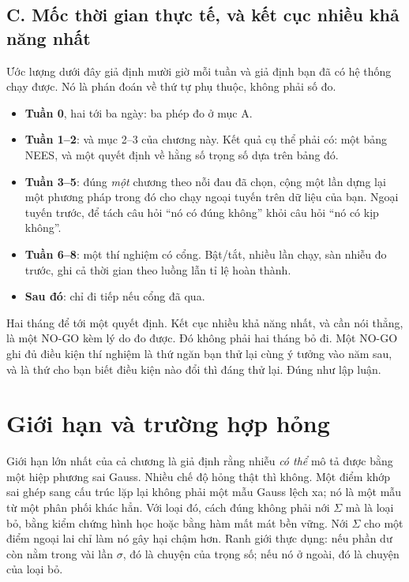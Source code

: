 \documentclass[../../deep_learning.tex]{subfiles}
\begin{document}
\subsection{C. Mốc thời gian thực tế, và kết cục nhiều khả năng nhất}

Ước lượng dưới đây giả định mười giờ mỗi tuần và giả định bạn đã có hệ thống chạy được. Nó là phán đoán về thứ tự phụ thuộc, không phải số đo.

\begin{itemize}
\item \textbf{Tuần 0}, hai tới ba ngày: ba phép đo ở mục A.
\item \textbf{Tuần 1--2}:  và mục 2--3 của chương này. Kết quả cụ thể phải có: một bảng NEES, và một quyết định về hằng số trọng số dựa trên bảng đó.
\item \textbf{Tuần 3--5}: đúng \emph{một} chương theo nỗi đau đã chọn, cộng một lần dựng lại một phương pháp trong đó cho chạy ngoại tuyến trên dữ liệu của bạn. Ngoại tuyến trước, để tách câu hỏi ``nó có đúng không'' khỏi câu hỏi ``nó có kịp không''.
\item \textbf{Tuần 6--8}: một thí nghiệm có cổng. Bật/tắt, nhiều lần chạy, sàn nhiễu đo trước, ghi cả thời gian theo luồng lẫn tỉ lệ hoàn thành.
\item \textbf{Sau đó}: chỉ đi tiếp nếu cổng đã qua.
\end{itemize}

Hai tháng để tới một quyết định. Kết cục nhiều khả năng nhất, và cần nói thẳng, là một NO-GO kèm lý do đo được. Đó không phải hai tháng bỏ đi. Một NO-GO ghi đủ điều kiện thí nghiệm là thứ ngăn bạn thử lại cùng ý tưởng vào năm sau, và là thứ cho bạn biết điều kiện nào đổi thì đáng thử lại. Đúng như  lập luận.

\section{Giới hạn và trường hợp hỏng}

Giới hạn lớn nhất của cả chương là giả định rằng nhiễu \emph{có thể} mô tả được bằng một hiệp phương sai Gauss. Nhiều chế độ hỏng thật thì không. Một điểm khớp sai ghép sang cấu trúc lặp lại không phải một mẫu Gauss lệch xa; nó là một mẫu từ một phân phối khác hẳn. Với loại đó, cách đúng không phải nới \(\Sigma\) mà là loại bỏ, bằng kiểm chứng hình học hoặc bằng hàm mất mát bền vững. Nới \(\Sigma\) cho một điểm ngoại lai chỉ làm nó gây hại chậm hơn. Ranh giới thực dụng: nếu phần dư còn nằm trong vài lần \(\sigma\), đó là chuyện của trọng số; nếu nó ở ngoài, đó là chuyện của loại bỏ.
\end{document}

